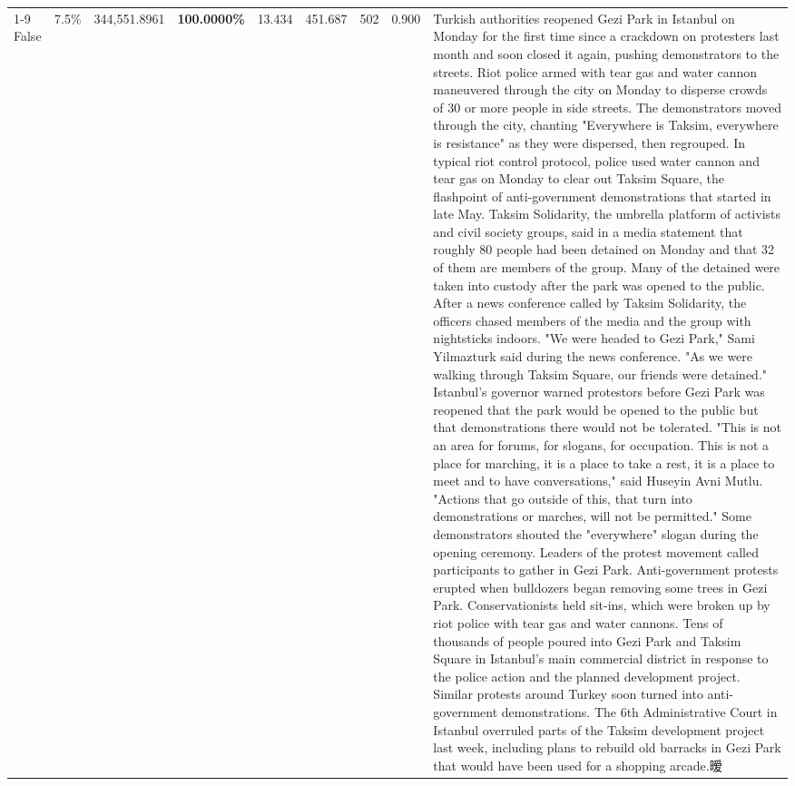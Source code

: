 \begin{table}[H]
\begin{tabular}{lllrlllll}
\cline{1-9}
False & 7.5\% & 344,551.8961 & \bfseries \color{red} 100.0000\% & 13.434 & 451.687 & 502 & 0.900 & Turkish authorities reopened Gezi Park in Istanbul on Monday for the first time since a crackdown on protesters last month and soon closed it again, pushing demonstrators to the streets. Riot police armed with tear gas and water cannon maneuvered through the city on Monday to disperse crowds of 30 or more people in side streets. The demonstrators moved through the city, chanting "Everywhere is Taksim, everywhere is resistance" as they were dispersed, then regrouped. In typical riot control protocol, police used water cannon and tear gas on Monday to clear out Taksim Square, the flashpoint of anti-government demonstrations that started in late May. Taksim Solidarity, the umbrella platform of activists and civil society groups, said in a media statement that roughly 80 people had been detained on Monday and that 32 of them are members of the group. Many of the detained were taken into custody after the park was opened to the public. After a news conference called by Taksim Solidarity, the officers chased members of the media and the group with nightsticks indoors. "We were headed to Gezi Park," Sami Yilmazturk said during the news conference. "As we were walking through Taksim Square, our friends were detained." Istanbul's governor warned protestors before Gezi Park was reopened that the park would be opened to the public but that demonstrations there would not be tolerated. "This is not an area for forums, for slogans, for occupation. This is not a place for marching, it is a place to take a rest, it is a place to meet and to have conversations," said Huseyin Avni Mutlu. "Actions that go outside of this, that turn into demonstrations or marches, will not be permitted." Some demonstrators shouted the "everywhere" slogan during the opening ceremony. Leaders of the protest movement called participants to gather in Gezi Park. Anti-government protests erupted when bulldozers began removing some trees in Gezi Park. Conservationists held sit-ins, which were broken up by riot police with tear gas and water cannons. Tens of thousands of people poured into Gezi Park and Taksim Square in Istanbul's main commercial district in response to the police action and the planned development project. Similar protests around Turkey soon turned into anti-government demonstrations. The 6th Administrative Court in Istanbul overruled parts of the Taksim development project last week, including plans to rebuild old barracks in Gezi Park that would have been used for a shopping arcade.暧 \\

\end{tabular}
\end{table}
